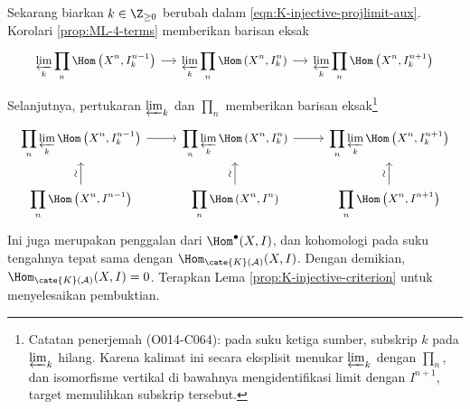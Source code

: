 \begin{bukti}
	Sekarang biarkan $k\in\Z_{\geq0}$ berubah dalam
	\eqref{eqn:K-injective-projlimit-aux}. Korolari
	\ref{prop:ML-4-terms} memberikan barisan eksak
	\[\begin{tikzcd}
		[column sep=small, every cell/.append style = {font = \small}]
		\displaystyle\varprojlim_k \displaystyle\prod_n
		\Hom\left( X^n, I_k^{n-1} \right) \arrow[r] &
		\displaystyle\varprojlim_k \displaystyle\prod_n
		\Hom\left( X^n, I_k^n \right) \arrow[r] &
		\displaystyle\varprojlim_k \displaystyle\prod_n
		\Hom\left( X^n, I_k^{n+1} \right)
	\end{tikzcd}\]
	Selanjutnya, pertukaran $\varprojlim_k$ dan $\prod_n$ memberikan barisan
	eksak\footnote{Catatan penerjemah (O014-C064): pada suku ketiga sumber,
	subskrip $k$ pada $\varprojlim_k$ hilang. Karena kalimat ini secara eksplisit
	menukar $\varprojlim_k$ dengan $\prod_n$, dan isomorfisme vertikal di bawahnya
	mengidentifikasi limit dengan $I^{n+1}$, target memulihkan subskrip tersebut.}
	\[\begin{tikzcd}
		[every cell/.append style = {font = \small}]
		\displaystyle\prod_n \varprojlim_k
		\Hom\left( X^n, I_k^{n-1} \right) \arrow[r] &
		\displaystyle\prod_n \varprojlim_k
		\Hom\left( X^n, I_k^n \right) \arrow[r] &
		\displaystyle\prod_n \varprojlim_k
		\Hom\left( X^n, I_k^{n+1} \right) \\
		\displaystyle\prod_n \Hom\left( X^n, I^{n-1} \right)
		\arrow[u, "\sim" sloped] &
		\displaystyle\prod_n \Hom\left( X^n, I^n \right)
		\arrow[u, "\sim" sloped] &
		\displaystyle\prod_n \Hom\left( X^n, I^{n+1} \right)
		\arrow[u, "\sim" sloped]
	\end{tikzcd}\]
	Ini juga merupakan penggalan dari $\Hom^\bullet(X,I)$, dan kohomologi
	pada suku tengahnya tepat sama dengan
	$\Hom_{\cate{K}(\mathcal{A})}(X,I)$. Dengan demikian,
	$\Hom_{\cate{K}(\mathcal{A})}(X,I)=0$. Terapkan Lema
	\ref{prop:K-injective-criterion} untuk menyelesaikan pembuktian.
\end{bukti}

